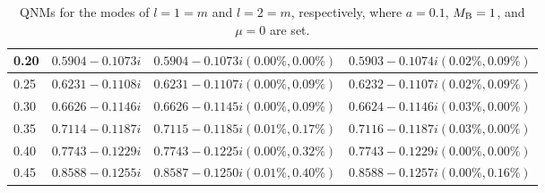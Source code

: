 \documentclass[12pt]{article}
\begin{document}
\begin{table}[t]
\begin{tabular}{|l|c|c|c|}
0.20&$0.5904-0.1073i $&$0.5904 - 0.1073 i(0.00\%, 0.00\%)$&$0.5903 - 0.1074 i(0.02\%, 0.09\%)$\\\hline
0.25&$0.6231-0.1108i $&$0.6231 - 0.1107 i(0.00\%, 0.09\%)$&$0.6232 - 0.1107 i(0.02\%, 0.09\%)$\\\hline
0.30&$0.6626-0.1146i $&$0.6626 - 0.1145 i(0.00\%, 0.09\%)$&$0.6624 - 0.1146 i(0.03\%, 0.00\%)$\\\hline
0.35&$0.7114-0.1187i$&$0.7115 - 0.1185 i(0.01\%, 0.17\%)$&$0.7116 - 0.1187 i(0.03\%, 0.00\%)$\\\hline
0.40&$0.7743-0.1229i$&$0.7743 - 0.1225 i (0.00\%, 0.32\%)$&$0.7743 - 0.1229 i(0.00\%, 0.00\%)$\\\hline
0.45&$0.8588-0.1255i$&$0.8587 - 0.1250 i(0.01\%, 0.40\%)$&$0.8588 - 0.1257 i(0.00\%, 0.16\%)$\\\hline
\end{tabular}
\caption{QNMs for the modes of $l=1=m$ and $l=2=m$, respectively, where  $a=0.1$, $M_{\rm B}=1$, and $\mu=0$ are set.}
\label{tab:QNM1}
\end{table}
\end{document}
